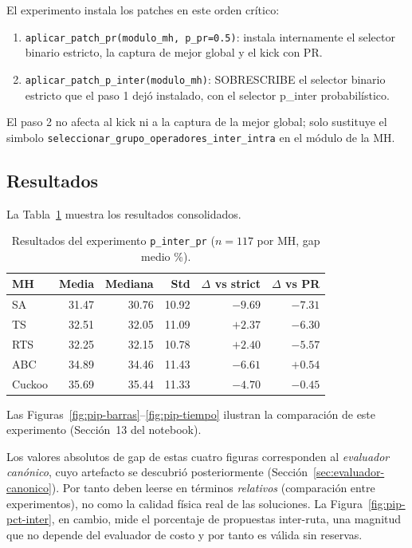 El experimento instala los patches en este orden crítico:

\begin{enumerate}
\item \texttt{aplicar\_patch\_pr(modulo\_mh, p\_pr=0.5)}: instala
  internamente el selector binario estricto, la captura de mejor
  global y el kick con PR.
\item \texttt{aplicar\_patch\_p\_inter(modulo\_mh)}: SOBRESCRIBE el
  selector binario estricto que el paso 1 dejó instalado, con el
  selector p\_inter probabilístico.
\end{enumerate}

El paso 2 no afecta al kick ni a la captura de la mejor global; solo
sustituye el simbolo
\texttt{seleccionar\_grupo\_operadores\_inter\_intra} en el módulo de
la MH.

\subsection{Resultados}

La Tabla~\ref{tab:pip-resultados} muestra los resultados consolidados.

\begin{table}[h]
\centering
\caption{Resultados del experimento \texttt{p\_inter\_pr} ($n=117$ por MH, gap medio \%).}
\label{tab:pip-resultados}
\small
\begin{tabular}{lrrrrr}
\toprule
MH & Media & Mediana & Std & $\Delta$ vs strict & $\Delta$ vs PR \\
\midrule
SA      & 31.47 & 30.76 & 10.92 & $-9.69$ & $-7.31$ \\
TS      & 32.51 & 32.05 & 11.09 & $+2.37$ & $-6.30$ \\
RTS     & 32.25 & 32.15 & 10.78 & $+2.40$ & $-5.57$ \\
ABC     & 34.89 & 34.46 & 11.43 & $-6.61$ & $+0.54$ \\
Cuckoo  & 35.69 & 35.44 & 11.33 & $-4.70$ & $-0.45$ \\
\bottomrule
\end{tabular}
\end{table}

Las Figuras~\ref{fig:pip-barras}--\ref{fig:pip-tiempo} ilustran la
comparación de este experimento (Sección~13 del notebook).

\begin{observacion}
Los valores absolutos de gap de estas cuatro figuras corresponden al
\emph{evaluador canónico}, cuyo artefacto se descubrió posteriormente
(Sección~\ref{sec:evaluador-canonico}). Por tanto deben leerse en
términos \emph{relativos} (comparación entre experimentos), no como la
calidad física real de las soluciones. La Figura~\ref{fig:pip-pct-inter},
en cambio, mide el porcentaje de propuestas inter-ruta, una magnitud que
no depende del evaluador de costo y por tanto es válida sin reservas.
\end{observacion}

